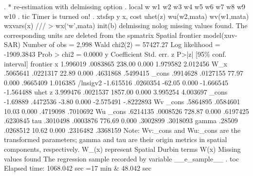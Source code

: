. * re-estimation with delmissing option 
. local w w1 w2 w3 w4 w5 w6 w7 w8 w9 w10
{\smallskip}
. tic
Timer is turned on!
{\smallskip}
. xtsfsp y x, cost uhet(z) wu(w2,mata) wv(w1,mata) wxvars(x) ///
>             wx(`w',mata) init(b) delmissing nolog
missing values found. The corresponding units are deleted from the spmatrix
{\smallskip}
Spatial frontier model(xuv-SAR)                       Number of obs =    2,998
                                                      Wald chi2(2)  = 57427.27
Log likelihood = -1909.3843                           Prob > chi2   =   0.0000
{\smallskip}
           y {\VBAR} Coefficient  Std. err.      z    P>|z|     [95\% conf. interval]
frontier     {\VBAR}
           x {\VBAR}   1.996019   .0083865   238.00   0.000     1.979582    2.012456
         W_x {\VBAR}   .5065641   .0221317    22.89   0.000     .4631868    .5499415
       _cons {\VBAR}   .9914628   .0127155    77.97   0.000     .9665409    1.016385
    /lnsigv2 {\VBAR}  -1.615516   .0260354   -62.05   0.000    -1.666545   -1.564488
uhet         {\VBAR}
           z {\VBAR}   3.999476   .0021537  1857.00   0.000     3.995254    4.003697
       _cons {\VBAR}   -1.69889   .4472536    -3.80   0.000    -2.575491   -.8222893
Wv           {\VBAR}
       _cons {\VBAR}   .5864895   .0584601    10.03   0.000     .4719098    .7010692
Wu           {\VBAR}
       _cons {\VBAR}   .6214135   .0008526   728.87   0.000     .6197425    .6230845
         tau {\VBAR}   .3010498   .0003876   776.69   0.000     .3002899    .3018093
       gamma {\VBAR}     .28509   .0268512    10.62   0.000     .2316482    .3368159
Note: Wv:_cons and Wu:_cons are the transformed parameters;
      gamma and tau are their origin metrics in spatial components, respectively.
      W_(x) represent Spatial Durbin terms W(x)
      Missing values found
      The regression sample recorded by variable __e_sample__
{\smallskip}
. toc
Elapsed time: 1068.042 sec
             =17 min \& 48.042 sec
{\smallskip}
